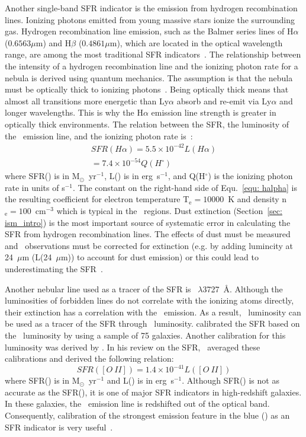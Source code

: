 Another single-band SFR indicator is the emission from hydrogen recombination lines. 
Ionizing photons emitted from young massive stars ionize the surrounding gas. Hydrogen recombination line emission, such as the Balmer series lines of H${\alpha}$ ($0.6563 \mu$m) and H${\beta}$ ($0.4861 \mu$m), which are located in the optical wavelength range, are among the most traditional SFR indicators~\citep{Kennicutt98a}. 
The relationship between the intensity of a hydrogen recombination line and the ionizing photon rate for a nebula is derived using quantum mechanics. 
The assumption is that the nebula must be optically thick to ionizing photons~\citep{Osterbrock06}.
Being optically thick means that almost all transitions more energetic than Ly${\alpha}$ absorb and re-emit via Ly${\alpha}$ and longer wavelengths.
This is why the H${\alpha}$ emission line strength is greater in optically thick environments. The relation between the SFR, the luminosity of the \halpha\ emission line, and the ionizing photon rate is~\citep[e.g.,][]{Osterbrock06, Kennicutt98b}:
\begin{align}
\label{equ: halpha}
SFR(H\alpha) = 5.5 \times 10^{-42}L(H\alpha) \\
                     = 7.4 \times 10^{-54}Q(H^{\circ})
\end{align}
where SFR(\halpha) is in M$_{\odot}$~yr$^{-1}$, L(\halpha) is in erg~s$^{-1}$, and Q(H$^{\circ}$) is the ionizing photon rate in units of s$^{-1}$.
The constant on the right-hand side of Equ.~\ref{equ: halpha} is the resulting coefficient for electron temperature T$_{\mathrm{e}}=10000$~K and density n$_{\mathrm{e}}=100$~cm$^{-3}$ which is typical in the \hii~regions.
Dust extinction (Section~\ref{sec: ism_intro}) is the most important source of systematic error in calculating the SFR from hydrogen recombination lines.
The effects of dust must be measured and \halpha\ observations must be corrected for extinction (e.g. by adding lumincity at 24~$\mu$m (L(24~$\mu$m)) to account for dust emission) or this could lead to underestimating the SFR~\citep{Kennicutt98b}.


Another nebular line used as a tracer of the SFR is \oii~$\lambda$3727~\AA. 
Although the luminosities of forbidden lines do not correlate with the ionizing atoms directly, their extinction has a correlation with the \halpha\ emission. 
As a result, \oii~luminosity can be used as a tracer of the SFR through \halpha\ luminosity. 
\cite{Gallagher89} calibrated the SFR based on the \oii~luminosity by using a sample of 75 galaxies. 
Another calibration for this luminosity was derived by \cite{Kennicutt92}. 
In his review on the SFR,~\citep{Kennicutt98b} averaged these calibrations and derived the following relation:
\begin{equation}
SFR([O\ II]) = 1.4 \times 10^{-41} L([O\ II])
\end{equation}  
where SFR(\oii) is in M$_{\odot}$~yr$^{-1}$ and L(\oii) is in erg~s$^{-1}$.
Although SFR(\oii) is not as accurate as the SFR(\halpha), it is one of major SFR indicators in high-redshift galaxies.
In these galaxies, the \halpha\ emission line is redshifted out of the optical band.
Consequently, calibration of the strongest emission feature in the blue (\oii) as an SFR indicator is very useful~\citep{Kennicutt98b}.


